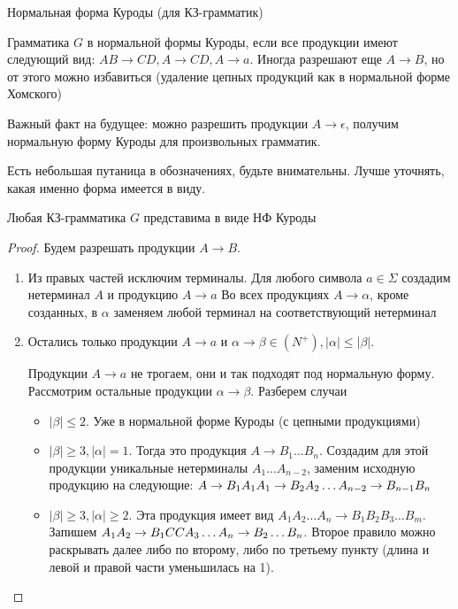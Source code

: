\begin{Def}
Нормальная форма Куроды (для КЗ-грамматик)

Грамматика $G$ в нормальной формы Куроды, если все продукции имеют следующий вид: $AB \to CD, A \to CD, A \to a$. 
Иногда разрешают еще $A \to B$, но от этого можно избавиться (удаление цепных продукций как в нормальной форме Хомского)
\end{Def}
\begin{Rem}
Важный факт на будущее: можно разрешить продукции $A \to \epsilon$, получим нормальную форму Куроды для произвольных грамматик.
\end{Rem}
\begin{Rem}
Есть небольшая путаница в обозначениях, будьте внимательны. Лучше уточнять, какая именно форма имеется в виду.
\end{Rem}
\begin{theorem}
Любая КЗ-грамматика $G$ представима в виде НФ Куроды
\end{theorem}
\begin{proof}
Будем разрешать продукции $A \to B$.
\begin{enumerate}
\item
Из правых частей исключим терминалы.
Для любого символа $a \in \Sigma$ создадим нетерминал $A$ и продукцию $A \to a$
Во всех продукциях $A \to \alpha$, кроме созданных, в $\alpha$ заменяем любой терминал на соответствующий нетерминал

\item
Остались только продукции $A \to a$ и $\alpha \to \beta \in (N^+), |\alpha| \leq |\beta|$. 

Продукции $A \to a$ не трогаем, они и так подходят под нормальную форму.
Рассмотрим остальные продукции $\alpha \to \beta$. Разберем случаи
\begin{itemize}
\item
$|\beta| \leq 2$. Уже в нормальной форме Куроды (с цепными продукциями)
\item
$|\beta| \geq 3, |\alpha| = 1$. Тогда это продукция $A \to B_1 \dots B_n$.
Создадим для этой продукции уникальные нетерминалы $A_1 \dots A_{n - 2}$, заменим исходную продукцию на следующие: $\\
A \to B_1 A_1 \\
A_1 \to B_2 A_2 \\ 
\dots \\
A_{n - 2} \to B_{n - 1} B_n
$
\item
$|\beta| \geq 3, |\alpha| \geq 2$. Эта продукция имеет вид $A_1A_2 \dots A_n \to B_1B_2B_3 \dots B_m$.
Запишем $\\
A_1 A_2 \to B_1 C \\
C A_3 \dots A_n \to B_2 \dots B_n$.
Второе правило можно раскрывать далее либо по второму, либо по третьему пункту (длина и левой и правой части уменьшилась на 1).
\end{itemize}
\end{enumerate}
\end{proof}
